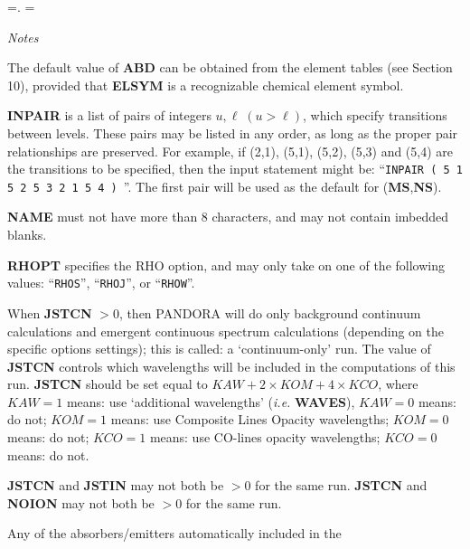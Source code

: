 %
\newtoks\footline \footline={\hss{}.\folio\hss}
%
\headline={\centerline{\it Notes}}
\blankline
\blankline
\centerline{}
\space \noindent
The default value of {\bf ABD} can be obtained from the element tables
(see Section 10), provided that {\bf ELSYM} is a recognizable chemical
element symbol.
\blankline
\blankline
\centerline{}
\space \noindent
{\bf INPAIR} is a list of pairs of integers $u, \ell \; (u > \ell)$,
which specify transitions between levels. These pairs may be listed in
any order, as long as the proper pair relationships are preserved.
For example, if (2,1), (5,1), (5,2), (5,3) and (5,4) are the transitions
to be specified, then the input statement might be: \np
``{\tt INPAIR ( 5 1   5 2   5 3   2 1   5 4 ) }''. \np
The first pair will be used as the default for ({\bf MS},{\bf NS}).
\blankline
\blankline
\centerline{}
\space \noindent
{\bf NAME} must not have more than 8 characters, and may not contain
imbedded blanks.
\blankline
\blankline
\centerline{}
\space \noindent
{\bf RHOPT} specifies the RHO option, and may only take on one of the following
values: ``{\tt{RHOS}}'', ``{\tt{RHOJ}}'', or ``{\tt{RHOW}}''.
\blankline
\blankline
\centerline{}
\space \noindent
When {\bf JSTCN} $> 0$, then PANDORA will do only background continuum
calculations and emergent continuous spectrum calculations (depending on the
specific options settings); this is called: a `continuum-only' run. \np
The value of {\bf JSTCN} controls which wavelengths will be included in the
computations of this run. \np
{\bf JSTCN} should be set equal to $KAW + 2 \times KOM + 4 \times KCO$, where 
\np
$KAW = 1$ means: use `additional wavelengths' ({\it i.e.}
{\bf WAVES}), $KAW = 0$ means: do not; \np
$KOM = 1$ means: use Composite Lines Opacity wavelengths;
$KOM = 0$ means: do not; \np
$KCO = 1$ means: use CO-lines opacity wavelengths; $KCO = 0$ means: do not.
\ej
\centerline{}
\space \noindent
{\bf JSTCN} and {\bf JSTIN} may not both be $> 0$ for the same run. \np
{\bf JSTCN} and {\bf NOION} may not both be $> 0$ for the same run.
\blankline
\blankline
\centerline{}
\space \noindent
Any of the absorbers/emitters automatically included in the 
